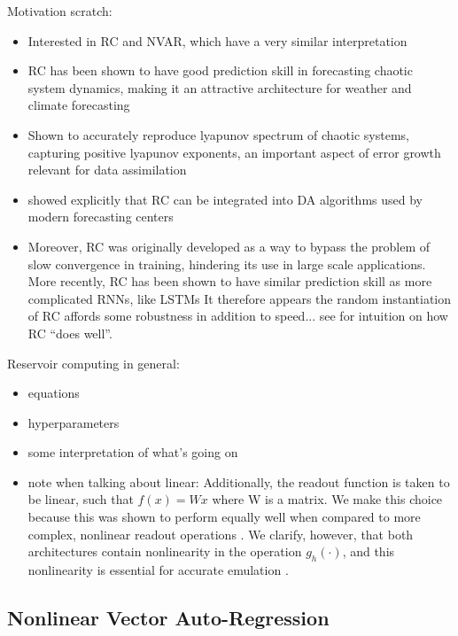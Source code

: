 Motivation scratch:
\begin{itemize}
    \item Interested in RC and NVAR, which have a very similar interpretation
    \item RC has been shown to have good prediction skill in forecasting chaotic
        system dynamics, making it an attractive architecture for weather and
        climate forecasting
    \item Shown to accurately reproduce lyapunov spectrum of chaotic systems,
        capturing positive lyapunov exponents, an important aspect of error
        growth relevant for data assimilation
    \item \citep{penny_integrating_2022} showed explicitly that RC can be
        integrated into DA algorithms used by modern forecasting centers
    \item Moreover,
        RC was originally developed as a way to bypass the problem of slow
        convergence in training, hindering its use in large scale applications.
        More recently,
        RC has been shown to have similar prediction skill as more
        complicated
        RNNs, like LSTMs \citep{vlachas_backpropagation_2020}
        It therefore appears the random instantiation of RC affords some
        robustness in addition to speed... see \citet{bollt_explaining_2021} for
        intuition on how RC ``does well''.
\end{itemize}

Reservoir computing in general:
\begin{itemize}
    \item equations
    \item hyperparameters
    \item some interpretation of what's going on
    \item note when talking about linear:
        Additionally, the readout function is taken to be linear, such that
        $f(x) = Wx$ where W is a matrix. We make this choice because
        this was shown to perform equally well when compared to more complex,
        nonlinear readout operations \citep{platt_systematic_2022}.
        We clarify, however, that both architectures contain nonlinearity in
        the operation $g_h(\cdot)$, and this nonlinearity is essential for
        accurate emulation  \citep{bollt_explaining_2021}.
\end{itemize}

\subsection{Nonlinear Vector Auto-Regression}
\label{subsec:nvar}

